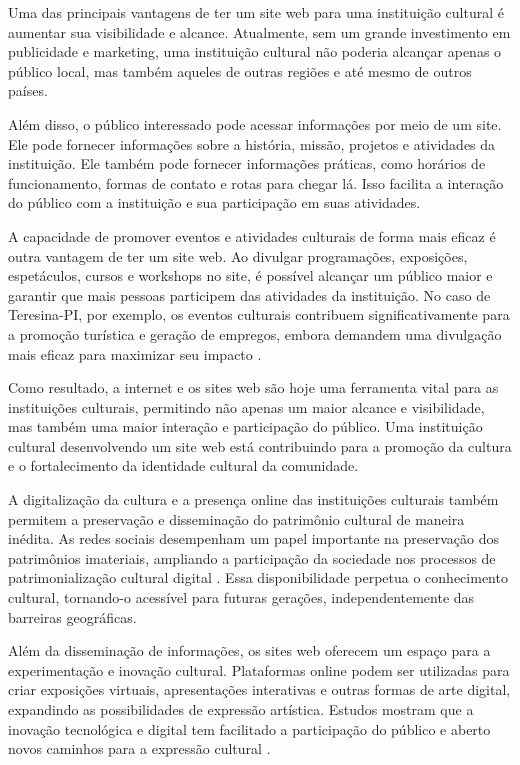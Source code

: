 Uma das principais vantagens de ter um site web para uma instituição cultural é aumentar sua visibilidade e alcance. Atualmente, sem um grande investimento em publicidade e marketing, uma instituição cultural não poderia alcançar apenas o público local, mas também aqueles de outras regiões e até mesmo de outros países.

Além disso, o público interessado pode acessar informações por meio de um site. Ele pode fornecer informações sobre a história, missão, projetos e atividades da instituição. Ele também pode fornecer informações práticas, como horários de funcionamento, formas de contato e rotas para chegar lá. Isso facilita a interação do público com a instituição e sua participação em suas atividades.

A capacidade de promover eventos e atividades culturais de forma mais eficaz é outra vantagem de ter um site web. Ao divulgar programações, exposições, espetáculos, cursos e workshops no site, é possível alcançar um público maior e garantir que mais pessoas participem das atividades da instituição. No caso de Teresina-PI, por exemplo, os eventos culturais contribuem significativamente para a promoção turística e geração de empregos, embora demandem uma divulgação mais eficaz para maximizar seu impacto \cite{gomes2009}.

Como resultado, a internet e os sites web são hoje uma ferramenta vital para as instituições culturais, permitindo não apenas um maior alcance e visibilidade, mas também uma maior interação e participação do público. Uma instituição cultural desenvolvendo um site web está contribuindo para a promoção da cultura e o fortalecimento da identidade cultural da comunidade.

A digitalização da cultura e a presença online das instituições culturais também permitem a preservação e disseminação do patrimônio cultural de maneira inédita. As redes sociais desempenham um papel importante na preservação dos patrimônios imateriais, ampliando a participação da sociedade nos processos de patrimonialização cultural digital \cite{ramires2019}. Essa disponibilidade perpetua o conhecimento cultural, tornando-o acessível para futuras gerações, independentemente das barreiras geográficas.

Além da disseminação de informações, os sites web oferecem um espaço para a experimentação e inovação cultural. Plataformas online podem ser utilizadas para criar exposições virtuais, apresentações interativas e outras formas de arte digital, expandindo as possibilidades de expressão artística. Estudos mostram que a inovação tecnológica e digital tem facilitado a participação do público e aberto novos caminhos para a expressão cultural \cite{lu2023}.


